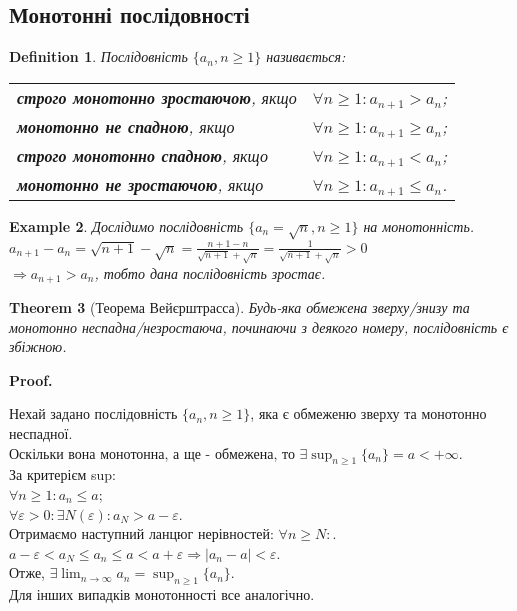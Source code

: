 \documentclass[a4paper, 14pt]{article}
\makeatletter
\def\huge{\displaystyle}
\def\qed{$\blacksquare$}
\theoremstyle{theoremdd}
\newtheorem{theorem}{Theorem}[subsection]
\theoremstyle{theoremdd}
\newtheorem{definition}[theorem]{Definition}
\theoremstyle{theoremdd}
\theoremstyle{theoremdd}
\newtheorem{example}[theorem]{Example}
\theoremstyle{theoremdd}
\theoremstyle{theoremdd}
\theoremstyle{theoremdd}
\theoremstyle{theoremdd}
\renewenvironment{proof}[1][Proof.\\]{\par
\pushQED{\hfill \qed}%
\normalfont \topsep6\p@\@plus6\p@\relax
\trivlist
\item\relax
{\bfseries
#1\@addpunct{.}}\hspace\labelsep\ignorespaces
}{%
\popQED\endtrivlist\@endpefalse
}
\makeatother
\begin{document}
	\subsection{Монотонні послідовності}
	\begin{definition}
	Послідовність $\{a_n, n \geq 1\}$ називається: \\
	\begin{tabular}{ll}
	\textbf{строго монотонно зростаючою}, якщо & $\forall n \geq 1: a_{n+1} > a_n$; \\
	\textbf{монотонно не спадною}, якщо & $\forall n \geq 1: a_{n+1} \geq a_n$; \\
	\textbf{строго монотонно спадною}, якщо & $\forall n \geq 1: a_{n+1} < a_n$; \\
	\textbf{монотонно не зростаючою}, якщо & $\forall n \geq 1: a_{n+1} \leq a_n$.
	\end{tabular}
	\end{definition}
	
	\begin{example}
	Дослідимо послідовність $\{a_n = \sqrt{n}, n \geq 1 \}$ на монотонність.\\
	$\displaystyle a_{n+1} - a_n = \sqrt{n+1} - \sqrt{n} = \frac{n+1-n}{\sqrt{n+1} + \sqrt{n}} = \frac{1}{\sqrt{n+1} + \sqrt{n}} > 0$\\
	$\Rightarrow a_{n+1}>a_n$, тобто дана послідовність зростає.
	\end{example}
	
	\begin{theorem}[Теорема Вейєрштрасса]
	Будь-яка обмежена зверху/знизу та монотонно неспадна/незростаюча, починаючи з деякого номеру, послідовність є збіжною.
	\end{theorem}
	\begin{proof}
	Нехай задано послідовність $\{a_n, n \geq 1\}$, яка є обмеженю зверху та монотонно неспадної.\\
	Оскільки вона монотонна, а ще - обмежена, то $\exists \huge\sup_{n \geq 1}\{a_n\} = a < +\infty$.\\
	За критерієм sup: \\
	$\forall n \geq 1: a_n \leq a$;\\
	$\forall \varepsilon > 0: \exists N(\varepsilon): a_{N} > a - \varepsilon$.\\
	Отримаємо наступний ланцюг нерівностей: $\forall n \geq N:$.\\
	$a-\varepsilon < a_N \leq a_n \leq a < a + \varepsilon \Rightarrow |a_n-a|<\varepsilon$.\\
	Отже, $\displaystyle \exists \lim_{n \to \infty} a_n = \sup_{n \geq 1}\{a_n\}$.
	\bigskip \\
	Для інших випадків монотонності все аналогічно.
	\end{proof}
	
\end{document}
